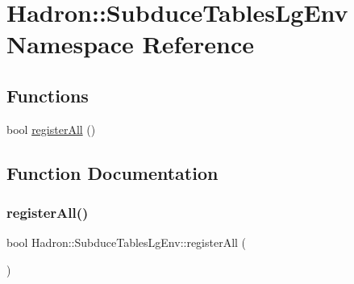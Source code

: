 \hypertarget{namespaceHadron_1_1SubduceTablesLgEnv}{}\section{Hadron\+:\+:Subduce\+Tables\+Lg\+Env Namespace Reference}
\label{namespaceHadron_1_1SubduceTablesLgEnv}
\subsection*{Functions}
\begin{DoxyCompactItemize}
\item 
bool \mbox{\hyperlink{namespaceHadron_1_1SubduceTablesLgEnv_abb63f9dacfb5b881f3052ce08000b859}{register\+All}} ()
\end{DoxyCompactItemize}


\subsection{Function Documentation}
\mbox{\label{namespaceHadron_1_1SubduceTablesLgEnv_abb63f9dacfb5b881f3052ce08000b859}} 
\subsubsection{\texorpdfstring{registerAll()}{registerAll()}}
{\footnotesize\ttfamily bool Hadron\+::\+Subduce\+Tables\+Lg\+Env\+::register\+All (\begin{DoxyParamCaption}{ }\end{DoxyParamCaption})}

